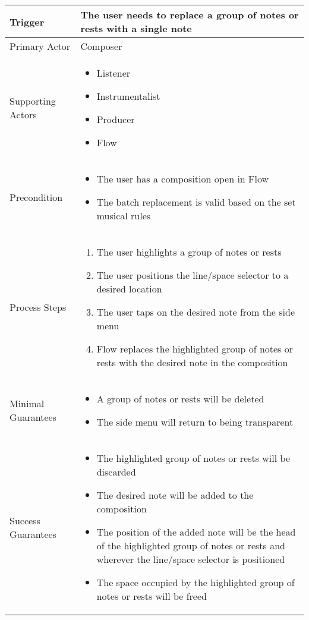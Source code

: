 \begin{longtable}{|X|X|}
\hline
Trigger & 
The user needs to replace a group of notes or rests with a single note \\
\hline
Primary Actor & 
Composer \\
\hline
Supporting Actors & 
\begin{itemize}
\item Listener
\item Instrumentalist
\item Producer
\item Flow
\end{itemize} \\
\hline
Precondition & 
\begin{itemize}
\item The user has a composition open in Flow
\item The batch replacement is valid based on the set musical rules
\end{itemize} \\
\hline
Process Steps & 
\begin{enumerate}
\item The user highlights a group of notes or rests
\item The user positions the line/space selector to a desired location
\item The user taps on the desired note from the side menu
\item Flow replaces the highlighted group of notes or rests with the desired note in the composition
\end{enumerate} \\
\hline
Minimal Guarantees & 
\begin{itemize}
  \item A group of notes or rests will be deleted
  \item The side menu will return to being transparent
\end{itemize} \\
\hline
Success Guarantees & 
\begin{itemize}
  \item The highlighted group of notes or rests will be discarded
  \item The desired note will be added to the composition
  \item The position of the added note will be the head of the highlighted group of notes or rests and wherever the line/space selector is positioned 
  \item The space occupied by the highlighted group of notes or rests will be freed
\end{itemize} \\
\hline
\end{longtable}